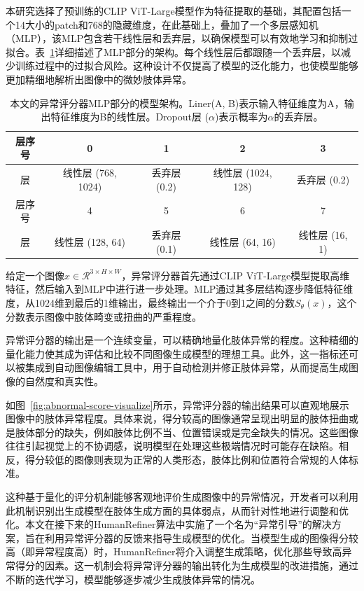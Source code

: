 本研究选择了预训练的CLIP ViT-Large模型作为特征提取的基础，其配置包括一个14大小的patch和768的隐藏维度，在此基础上，叠加了一个多层感知机（MLP），该MLP包含若干线性层和丢弃层，以确保模型可以有效地学习和抑制过拟合。表~\ref{tab:model-architecture-abnormal-scorer}详细描述了MLP部分的架构。每个线性层后都跟随一个丢弃层，以减少训练过程中的过拟合风险。这种设计不仅提高了模型的泛化能力，也使模型能够更加精细地解析出图像中的微妙肢体异常。



\begin{table}[htb]
    \centering
    \caption{本文的异常评分器MLP部分的模型架构。Liner(A, B)表示输入特征维度为A，输出特征维度为B的线性层。Dropout层 ($\alpha$)表示概率为$\alpha$的丢弃层。}
    \begin{tabular}{c|cccc}
        \toprule
        层序号 & 0 & 1 &  2 &  3 \\
        \hline
        层 & 线性层 (768, 1024) & 丢弃层 (0.2) & 线性层 (1024, 128) & 丢弃层 (0.2) \\
        \hline
        层序号 &  4&  5 & 6 & 7 \\
        \hline
        层 & 线性层 (128, 64) & 丢弃层 (0.1) & 线性层 (64, 16) & 线性层 (16, 1) \\
        \bottomrule
    \end{tabular}
    \label{tab:model-architecture-abnormal-scorer}
\end{table}

给定一个图像$x \in \mathcal{R}^{3 \times H \times W}$，异常评分器首先通过CLIP ViT-Large模型提取高维特征，然后输入到MLP中进行进一步处理。MLP通过其多层结构逐步降低特征维度，从1024维到最后的1维输出，最终输出一个介于0到1之间的分数$S_\theta(x)$，这个分数表示图像中肢体畸变或扭曲的严重程度。

异常评分器的输出是一个连续变量，可以精确地量化肢体异常的程度。这种精细的量化能力使其成为评估和比较不同图像生成模型的理想工具。此外，这一指标还可以被集成到自动图像编辑工具中，用于自动检测并修正肢体异常，从而提高生成图像的自然度和真实性。



如图~\ref{fig:abnormal-score-visualize}所示，异常评分器的输出结果可以直观地展示图像中的肢体异常程度。具体来说，得分较高的图像通常呈现出明显的肢体扭曲或是肢体部分的缺失，例如肢体比例不当、位置错误或是完全缺失的情况。这些图像往往引起视觉上的不协调感，说明模型在处理这些极端情况时可能存在缺陷。相反，得分较低的图像则表现为正常的人类形态，肢体比例和位置符合常规的人体标准。

这种基于量化的评分机制能够客观地评价生成图像中的异常情况，开发者可以利用此机制识别出生成模型在肢体生成方面的具体弱点，从而针对性地进行调整和优化。本文在接下来的HumanRefiner算法中实施了一个名为“异常引导”的解决方案，旨在利用异常评分器的反馈来指导生成模型的优化。当模型生成的图像得分较高（即异常程度高）时，HumanRefiner将介入调整生成策略，优化那些导致高异常得分的因素。这一机制会将异常评分器的输出转化为生成模型的改进措施，通过不断的迭代学习，模型能够逐步减少生成肢体异常的情况。

